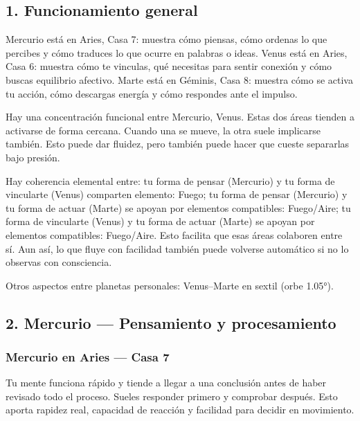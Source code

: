 \documentclass[11pt,a4paper]{article}
\begin{document}
\justifying

\vspace{0.8cm}

\subsection{1. Funcionamiento general}

\justifying
Mercurio está en Aries, Casa 7: muestra cómo piensas, cómo ordenas lo que percibes y cómo traduces lo que ocurre en palabras o ideas.
Venus está en Aries, Casa 6: muestra cómo te vinculas, qué necesitas para sentir conexión y cómo buscas equilibrio afectivo.
Marte está en Géminis, Casa 8: muestra cómo se activa tu acción, cómo descargas energía y cómo respondes ante el impulso.

Hay una concentración funcional entre Mercurio, Venus. Estas dos áreas tienden a activarse de forma cercana. Cuando una se mueve, la otra suele implicarse también. Esto puede dar fluidez, pero también puede hacer que cueste separarlas bajo presión.

Hay coherencia elemental entre: tu forma de pensar (Mercurio) y tu forma de vincularte (Venus) comparten elemento: Fuego; tu forma de pensar (Mercurio) y tu forma de actuar (Marte) se apoyan por elementos compatibles: Fuego/Aire; tu forma de vincularte (Venus) y tu forma de actuar (Marte) se apoyan por elementos compatibles: Fuego/Aire. Esto facilita que esas áreas colaboren entre sí. Aun así, lo que fluye con facilidad también puede volverse automático si no lo observas con consciencia.

Otros aspectos entre planetas personales: Venus–Marte en sextil (orbe 1.05°).

\vspace{0.8cm}

\subsection{2. Mercurio — Pensamiento y procesamiento}

\subsubsection*{Mercurio en Aries — Casa 7}

\justifying
Tu mente funciona rápido y tiende a llegar a una conclusión antes de haber revisado todo el proceso. Sueles responder primero y comprobar después. Esto aporta rapidez real, capacidad de reacción y facilidad para decidir en movimiento.
\end{document}
